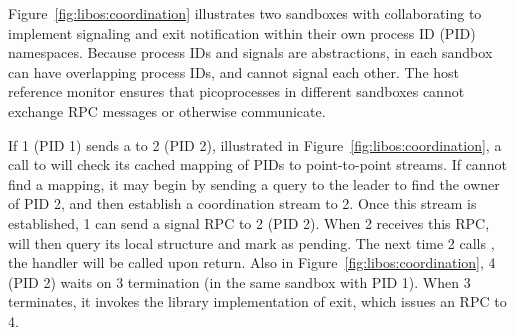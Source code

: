 Figure~\ref{fig:libos:coordination} illustrates two sandboxes with \picoprocs{}
collaborating to implement 
signaling and exit notification
within their own
process ID (PID) namespaces.  
Because process IDs and signals are \libos{} abstractions,
\picoprocs{} in 
each sandbox can have overlapping process IDs, and
cannot signal each other.
The host reference monitor ensures that
picoprocesses in different sandboxes cannot 
exchange RPC messages or otherwise communicate.



If \picoproc{} 1 (PID 1) sends a  to \picoproc{} 2 (PID 2), illustrated in Figure~\ref{fig:libos:coordination},
a  call to \thelibos{} will check its cached mapping of PIDs to 
point-to-point streams.
If \thelibos{} cannot find a mapping, it may begin by sending a query to the leader
to find the owner of PID 2,
and then establish a coordination stream to \picoproc{} 2.
Once this stream is established, \picoproc{} 1 can send a  
signal RPC to \picoproc{} 2 (PID 2).
When \picoproc{} 2 receives this RPC, 
\thelibos{} will then query its local  
structure and mark  as pending.
The next time \picoproc{} 2 calls ,
the  handler will be called upon return. Also in Figure~\ref{fig:libos:coordination}, \picoproc{} 4 (PID 2) waits on 
\picoproc{} 3 termination (in the same sandbox with PID 1). When \picoproc{} 3 terminates, it invokes the library implementation of exit, which issues
an  RPC to \picoproc{} 4.


